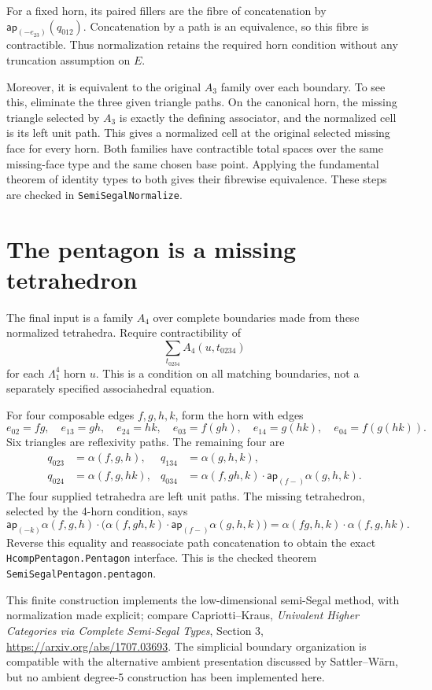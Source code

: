 \documentclass[11pt]{amsart}
\newcommand{\code}[1]{\nolinkurl{#1}}
\begin{document}
For a fixed horn, its paired fillers are the fibre of concatenation
by $\mathsf{ap}_{(-e_{23})}(q_{012})$. Concatenation by a path is an
equivalence, so this fibre is contractible. Thus normalization retains
the required horn condition without any truncation assumption on $E$.

Moreover, it is equivalent to the original $A_3$ family over each
boundary. To see this, eliminate the three given triangle paths. On
the canonical horn, the missing triangle selected by $A_3$ is exactly
the defining associator, and the normalized cell is its left unit path.
This gives a normalized cell at the original selected missing face
for every horn. Both families have contractible total spaces over the
same missing-face type and the same chosen base point. Applying the
fundamental theorem of identity types to both gives their fibrewise
equivalence. These steps are checked in \code{SemiSegalNormalize}.

\section{The pentagon is a missing tetrahedron}

The final input is a family $A_4$ over complete boundaries made from
these normalized tetrahedra. Require contractibility of
\[
 \sum_{t_{0234}} A_4(u,t_{0234})
\]
for each $\Lambda^4_1$ horn $u$. This is a condition on all matching
boundaries, not a separately specified associahedral equation.

For four composable edges $f,g,h,k$, form the horn with edges
\[
 e_{02}=fg,\quad e_{13}=gh,\quad e_{24}=hk,\quad
 e_{03}=f(gh),\quad e_{14}=g(hk),\quad e_{04}=f(g(hk)).
\]
Six triangles are reflexivity paths. The remaining four are
\begin{align*}
 q_{023}&=\alpha(f,g,h), & q_{134}&=\alpha(g,h,k),\\
 q_{024}&=\alpha(f,g,hk), &
 q_{034}&=\alpha(f,gh,k)\cdot\mathsf{ap}_{(f-)}\alpha(g,h,k).
\end{align*}
The four supplied tetrahedra are left unit paths. The missing
tetrahedron, selected by the 4-horn condition, says
\[
 \mathsf{ap}_{(-k)}\alpha(f,g,h)\cdot
   \bigl(\alpha(f,gh,k)\cdot\mathsf{ap}_{(f-)}\alpha(g,h,k)\bigr)
   =\alpha(fg,h,k)\cdot\alpha(f,g,hk).
\]
Reverse this equality and reassociate path concatenation to obtain
the exact \code{HcompPentagon.Pentagon} interface.
This is the checked theorem \code{SemiSegalPentagon.pentagon}.

This finite construction implements the low-dimensional semi-Segal
method, with normalization made explicit; compare Capriotti--Kraus,
\emph{Univalent Higher Categories via Complete Semi-Segal Types},
Section 3, \url{https://arxiv.org/abs/1707.03693}.
The simplicial boundary organization is compatible with the alternative
ambient presentation discussed by Sattler--W\"arn, but no ambient
degree-5 construction has been implemented here.
\end{document}
